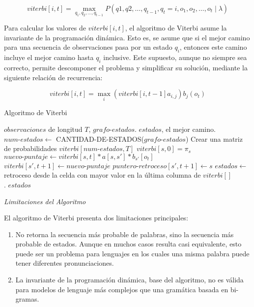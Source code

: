 \begin{equation*}
	viterbi[i,t] = \displaystyle \max_{q_1,q_2,\ldots,q_{t - 1}} P(q1,q2,\ldots,q_{t - 1},q_t = i,o_1,o_2,\ldots,o_t \mid \lambda) 	
\end{equation*} 

Para calcular los valores de $viterbi[i,t]$, el algoritmo de Viterbi asume la invariante de la programaci\'on din\'amica.
Esto es, se asume que si el mejor camino para una secuencia de observaciones pasa por un estado $q_i$, entonces este
camino incluye el mejor camino hasta $q_i$ inclusive. Este supuesto, aunque no siempre sea correcto, permite descomponer
el problema y simplificar su soluci\'on, mediante la siguiente relaci\'on de recurrencia:

\begin{equation*}
	viterbi[i,t] = \displaystyle \max_i (viterbi[i,t-1]a_{i,j})b_j(o_t)
\end{equation*}

\begin{algorithm}[H]
\caption{Algoritmo de Viterbi} \label{viterbi}
\begin{algorithmic}[1]
\REQUIRE $observaciones$ de longitud $T$, $grafo\mbox{-}estados$.
\ENSURE $estados$, el mejor camino.
\STATE $num\mbox{-}estados \leftarrow$ CANTIDAD-DE-ESTADOS($grafo\mbox{-}estados$) 
\STATE Crear una matriz de probabilidades $viterbi[num\mbox{-}estados, T]$
	\STATE $viterbi[s,0] = \pi_s$
\ENDFOR
{}
		\STATE $nuevo\mbox{-}puntaje \leftarrow viterbi[s,t] * a[s,s'] * b_{s'}[o_t]$
			\STATE $viterbi[s',t+1] \leftarrow nuevo\mbox{-}puntaje$
			\STATE $puntero\mbox{-}retroceso[s',t+1] \leftarrow s$
		\ENDIF  
		\ENDFOR
	\ENDFOR
\ENDFOR
\STATE $estados \leftarrow$ retroceso desde la celda con mayor valor en la \'ultima columna de $viterbi[]$
\\ .
\RETURN $estados$
\end{algorithmic}
\end{algorithm}

\emph{Limitaciones del Algoritmo}

El algoritmo de Viterbi presenta dos limitaciones principales:
\begin{enumerate}
	\item No retorna la secuencia m\'as probable de palabras, sino la secuencia m\'as probable de estados. Aunque en muchos casos resulta casi
	equivalente, esto puede ser un problema para lenguajes en los cuales una misma palabra puede tener diferentes pronunciaciones.
	\item La invariante de la programaci\'on din\'amica, base del algoritmo, no es v\'alida para modelos de lenguaje m\'as complejos que una
	gram\'atica basada en bi-gramas.
\end{enumerate}

